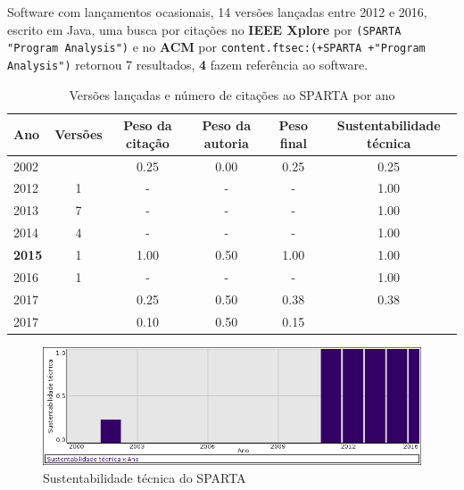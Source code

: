 Software com lançamentos ocasionais,
14 versões lançadas
entre 2012 e 2016,
escrito em Java,
uma busca por citações no {\bf IEEE Xplore} por
\texttt{(SPARTA "Program Analysis")}
e no {\bf ACM} por
\texttt{content.ftsec:(+SPARTA +"Program Analysis")}
retornou
7 resultados,
{\bf 4} fazem referência ao software.


\begin{table}[H]
\caption{Versões lançadas e número de citações ao SPARTA por ano}
\centering
\begin{tabular}{| l | c | c | c | c | c |}
  \hline
  Ano & Versões & Peso da citação & Peso da autoria & Peso final & Sustentabilidade técnica \\
  \hline
            2002
          &
          
          &
          0.25
          &
          0.00
          &
          0.25
          &
            {\color{red} 0.25}
          \\
\hline
        2012 & 1 & - & - & -
        &
          {\color{blue} 1.00}
        \\
\hline
        2013 & 7 & - & - & -
        &
          {\color{blue} 1.00}
        \\
\hline
        2014 & 4 & - & - & -
        &
          {\color{blue} 1.00}
        \\
\hline
            {\bf 2015}
          &
          1
          &
          1.00
          &
          0.50
          &
          1.00
          &
            {\color{blue} 1.00}
          \\
\hline
        2016 & 1 & - & - & -
        &
          {\color{blue} 1.00}
        \\
\hline
            2017
          &
          
          &
          0.25
          &
          0.50
          &
          0.38
          &
            {\color{red} 0.38}
          \\
            2017
          &
          
          &
          0.10
          &
          0.50
          &
          0.15
          &
          \\
\hline
\end{tabular}
\end{table}

\begin{figure}[h]
  \center
  \includegraphics[scale=0.50]{imagens/softwares-charts/sparta.png}
  \caption{Sustentabilidade técnica do SPARTA}
\end{figure}


